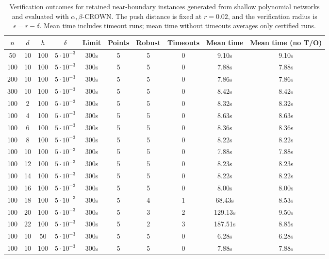 \documentclass{article}
\theoremstyle{definition}
\begin{document}
\begin{table}[th]
\caption{Verification outcomes for retained near-boundary instances generated from shallow polynomial networks and evaluated with $\alpha,\beta$-CROWN. The push distance is fixed at $r=0.02$, and the verification radius is $\epsilon=r-\delta$. Mean time includes timeout runs; mean time without timeouts averages only certified runs.}


\setlength{\tabcolsep}{4pt}

\centering
\begin{tabular}{c c c c c c c c c c}
\toprule
$n$ & $d$ & $h$ & $\delta$ & Limit & Points & Robust & Timeouts & Mean time & Mean time (no T/O) \\
\midrule
50  & 10 & 100 & $5\cdot10^{-3}$ & 300s & 5 & 5 & 0 & 9.10s  & 9.10s \\
100 & 10 & 100 & $5\cdot10^{-3}$ & 300s & 5 & 5 & 0 & 7.88s  & 7.88s \\
200 & 10 & 100 & $5\cdot10^{-3}$ & 300s & 5 & 5 & 0 & 7.86s  & 7.86s \\
300 & 10 & 100 & $5\cdot10^{-3}$ & 300s & 5 & 5 & 0 & 8.42s  & 8.42s \\
\midrule
100 & 2  & 100 & $5\cdot10^{-3}$ & 300s & 5 & 5 & 0 & 8.32s  & 8.32s \\
100 & 4  & 100 & $5\cdot10^{-3}$ & 300s & 5 & 5 & 0 & 8.63s  & 8.63s \\
100 & 6  & 100 & $5\cdot10^{-3}$ & 300s & 5 & 5 & 0 & 8.36s  & 8.36s \\
100 & 8  & 100 & $5\cdot10^{-3}$ & 300s & 5 & 5 & 0 & 8.22s  & 8.22s \\
100 & 10 & 100 & $5\cdot10^{-3}$ & 300s & 5 & 5 & 0 & 7.88s  & 7.88s \\
100 & 12 & 100 & $5\cdot10^{-3}$ & 300s & 5 & 5 & 0 & 8.23s  & 8.23s \\
100 & 14 & 100 & $5\cdot10^{-3}$ & 300s & 5 & 5 & 0 & 8.22s  & 8.22s \\
100 & 16 & 100 & $5\cdot10^{-3}$ & 300s & 5 & 5 & 0 & 8.00s  & 8.00s \\
100 & 18 & 100 & $5\cdot10^{-3}$ & 300s & 5 & 4 & 1 & 68.43s & 8.53s \\
100 & 20 & 100 & $5\cdot10^{-3}$ & 300s & 5 & 3 & 2 & 129.13s & 9.50s \\
100 & 22 & 100 & $5\cdot10^{-3}$ & 300s & 5 & 2 & 3 & 187.51s & 8.85s \\
\midrule
100 & 10 & 50  & $5\cdot10^{-3}$ & 300s & 5 & 5 & 0 & 6.28s  & 6.28s \\
100 & 10 & 100 & $5\cdot10^{-3}$ & 300s & 5 & 5 & 0 & 7.88s  & 7.88s \\

\end{tabular}
\end{table}
\end{document}
